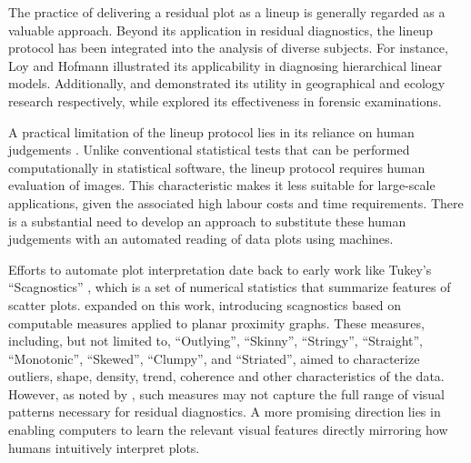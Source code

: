 \documentclass[]{interact}
\theoremstyle{plain}%
\theoremstyle{definition}
\theoremstyle{remark}
\begin{document}
The practice of delivering a residual plot as a lineup is generally
regarded as a valuable approach. Beyond its application in residual
diagnostics, the lineup protocol has been integrated into the analysis
of diverse subjects. For instance, Loy and Hofmann
\citetext{\citeyear{loy2013diagnostic}; \citeyear{loy2014hlmdiag}; \citeyear{loy2015you}}
illustrated its applicability in diagnosing hierarchical linear models.
Additionally, \citet{widen2016graphical} and \citet{fieberg2024using}
demonstrated its utility in geographical and ecology research
respectively, while \citet{krishnan2021hierarchical} explored its
effectiveness in forensic examinations.

A practical limitation of the lineup protocol lies in its reliance on
human judgements \citep[see][ about the practical
limitations]{li2024plot}. Unlike conventional statistical tests that can
be performed computationally in statistical software, the lineup
protocol requires human evaluation of images. This characteristic makes
it less suitable for large-scale applications, given the associated high
labour costs and time requirements. There is a substantial need to
develop an approach to substitute these human judgements with an
automated reading of data plots using machines.

Efforts to automate plot interpretation date back to early work like
Tukey's ``Scagnostics'' \citep{tukey1985computer}, which is a set of
numerical statistics that summarize features of scatter plots.
\citet{wilkinson2005graph} expanded on this work, introducing
scagnostics based on computable measures applied to planar proximity
graphs. These measures, including, but not limited to, ``Outlying'',
``Skinny'', ``Stringy'', ``Straight'', ``Monotonic'', ``Skewed'',
``Clumpy'', and ``Striated'', aimed to characterize outliers, shape,
density, trend, coherence and other characteristics of the data.
However, as noted by \citet{buja2009statistical}, such measures may not
capture the full range of visual patterns necessary for residual
diagnostics. A more promising direction lies in enabling computers to
learn the relevant visual features directly mirroring how humans
intuitively interpret plots.
\end{document}
